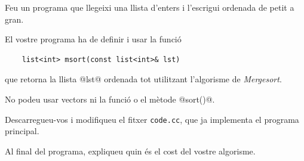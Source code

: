 
\Statement

Feu un programa que llegeixi una llista d'enters i l'escrigui ordenada de petit a gran.

\medskip

El vostre programa ha de definir i usar la funció 

\begin{lstlisting}
    list<int> msort(const list<int>& lst)
\end{lstlisting}

que retorna la llista @lst@ ordenada tot utilitzant l'algorisme de \emph{Mergesort}.

\medskip

No podeu usar vectors ni la funció o el mètode @sort()@.

\medskip

Descarregueu-vos i modifiqueu el fitxer \texttt{code.cc}, que ja implementa el programa principal.

\medskip

Al final del programa, expliqueu quin és el cost del vostre algorisme.

\SampleTwoCol